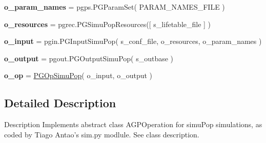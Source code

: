 \begin{DoxyCompactItemize}
\item 
{\bfseries o\+\_\+param\+\_\+names} = pgps.\+P\+G\+Param\+Set( P\+A\+R\+A\+M\+\_\+\+N\+A\+M\+E\+S\+\_\+\+F\+I\+LE )\hypertarget{namespacenegui_1_1pgopsimupop_a19188f6d1a8be14d817f714253f72524}{}\label{namespacenegui_1_1pgopsimupop_a19188f6d1a8be14d817f714253f72524}

\item 
{\bfseries o\+\_\+resources} = pgrec.\+P\+G\+Simu\+Pop\+Resources(\mbox{[} s\+\_\+lifetable\+\_\+file \mbox{]} )\hypertarget{namespacenegui_1_1pgopsimupop_a2e48d554443220321fa4e2d7d54ce6d0}{}\label{namespacenegui_1_1pgopsimupop_a2e48d554443220321fa4e2d7d54ce6d0}

\item 
{\bfseries o\+\_\+input} = pgin.\+P\+G\+Input\+Simu\+Pop( s\+\_\+conf\+\_\+file, o\+\_\+resources, o\+\_\+param\+\_\+names )\hypertarget{namespacenegui_1_1pgopsimupop_af6081fd95bb8d80f4596802ee94584f4}{}\label{namespacenegui_1_1pgopsimupop_af6081fd95bb8d80f4596802ee94584f4}

\item 
{\bfseries o\+\_\+output} = pgout.\+P\+G\+Output\+Simu\+Pop( s\+\_\+outbase )\hypertarget{namespacenegui_1_1pgopsimupop_a7a8ef84b45b8957cdb95d853da85e2a6}{}\label{namespacenegui_1_1pgopsimupop_a7a8ef84b45b8957cdb95d853da85e2a6}

\item 
{\bfseries o\+\_\+op} = \hyperlink{classnegui_1_1pgopsimupop_1_1PGOpSimuPop}{P\+G\+Op\+Simu\+Pop}( o\+\_\+input, o\+\_\+output )\hypertarget{namespacenegui_1_1pgopsimupop_a5a81830b86fd00feca327e6861c2abe8}{}\label{namespacenegui_1_1pgopsimupop_a5a81830b86fd00feca327e6861c2abe8}

\end{DoxyCompactItemize}


\subsection{Detailed Description}
\begin{DoxyVerb}Description
Implements abstract class AGPOperation for simuPop simulations,
as coded by Tiago Antao's sim.py modlule.  See class description.
\end{DoxyVerb}
 